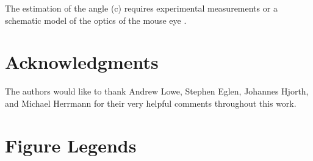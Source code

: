 \documentclass[10pt]{article}
\begin{document}
The estimation of the angle (c) requires experimental measurements or
a schematic model of the optics of the mouse eye
\cite{RemtHall85schem,SchmScha04para}.




\section*{Acknowledgments}

The authors would like to thank Andrew Lowe, Stephen Eglen, Johannes
Hjorth, and Michael Herrmann for their very helpful comments
throughout this work.

\newcommand{\myshortjournaltitles}{}

%

\section*{Figure Legends}
\end{document}

